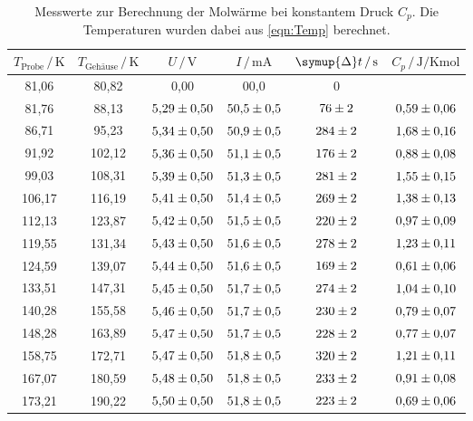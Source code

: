 \begin{table}
    \centering
    \caption{Messwerte zur Berechnung der Molwärme bei konstantem Druck $C_p$. Die Temperaturen wurden dabei aus \eqref{eqn:Temp} berechnet.}
    \label{tab:mess1}
    \begin{tabular}{c c c c c c}
    \toprule
    $T_\text{Probe} \,/\, \si{\kelvin}$ & $T_\text{Gehäuse} \,/\, \si{\kelvin}$ & $U \,/\, \si{\volt}$
    & $I \,/\, \si{\milli\ampere}$ & $\symup{\Delta}t \,/\, \si{\second}$
    & $C_p \,/\, \si{\joule\per\kelvin\mole}$\\
    \midrule 
         81,06 &  80,82 & 0,00 & 00,0 & 0 & \\
         81,76 &  88,13 & $\num{5.29+-0.5}$ & $\num{50.5+-0.5}$ & $\num{ 76+-2}$ & $\num{0.59+-0.06}$\\
         86,71 &  95,23 & $\num{5.34+-0.5}$ & $\num{50.9+-0.5}$ & $\num{284+-2}$ & $\num{1.68+-0.16}$\\
         91,92 & 102,12 & $\num{5.36+-0.5}$ & $\num{51.1+-0.5}$ & $\num{176+-2}$ & $\num{0.88+-0.08}$\\
         99,03 & 108,31 & $\num{5.39+-0.5}$ & $\num{51.3+-0.5}$ & $\num{281+-2}$ & $\num{1.55+-0.15}$\\
        106,17 & 116,19 & $\num{5.41+-0.5}$ & $\num{51.4+-0.5}$ & $\num{269+-2}$ & $\num{1.38+-0.13}$\\
        112,13 & 123,87 & $\num{5.42+-0.5}$ & $\num{51.5+-0.5}$ & $\num{220+-2}$ & $\num{0.97+-0.09}$\\
        119,55 & 131,34 & $\num{5.43+-0.5}$ & $\num{51.6+-0.5}$ & $\num{278+-2}$ & $\num{1.23+-0.11}$\\
        124,59 & 139,07 & $\num{5.44+-0.5}$ & $\num{51.6+-0.5}$ & $\num{169+-2}$ & $\num{0.61+-0.06}$\\
        133,51 & 147,31 & $\num{5.45+-0.5}$ & $\num{51.7+-0.5}$ & $\num{274+-2}$ & $\num{1.04+-0.10}$\\
        140,28 & 155,58 & $\num{5.46+-0.5}$ & $\num{51.7+-0.5}$ & $\num{230+-2}$ & $\num{0.79+-0.07}$\\
        148,28 & 163,89 & $\num{5.47+-0.5}$ & $\num{51.7+-0.5}$ & $\num{228+-2}$ & $\num{0.77+-0.07}$\\
        158,75 & 172,71 & $\num{5.47+-0.5}$ & $\num{51.8+-0.5}$ & $\num{320+-2}$ & $\num{1.21+-0.11}$\\
        167,07 & 180,59 & $\num{5.48+-0.5}$ & $\num{51.8+-0.5}$ & $\num{233+-2}$ & $\num{0.91+-0.08}$\\
        173,21 & 190,22 & $\num{5.50+-0.5}$ & $\num{51.8+-0.5}$ & $\num{223+-2}$ & $\num{0.69+-0.06}$\\

\end{tabular}
\end{table}
